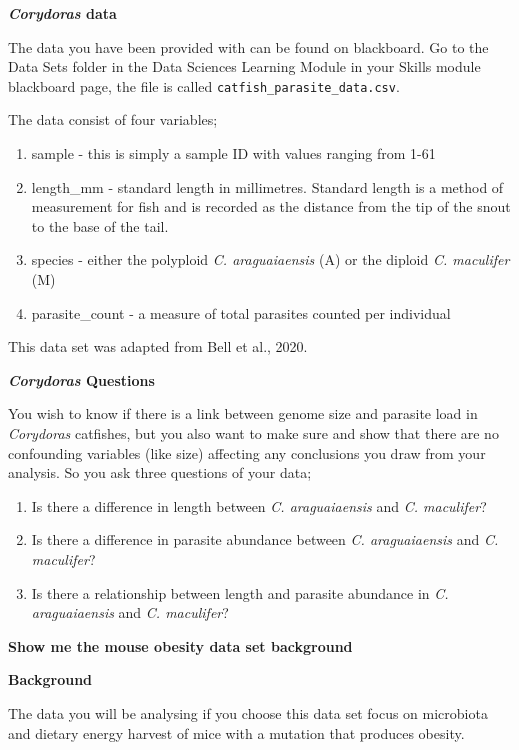 \documentclass[
]{book}
\providecommand{\tightlist}{%
  \setlength{\itemsep}{0pt}\setlength{\parskip}{0pt}}
\begin{document}
\textbf{\emph{Corydoras} data}

The data you have been provided with can be found on blackboard. Go to the Data Sets folder in the Data Sciences Learning Module in your Skills module blackboard page, the file is called \texttt{catfish\_parasite\_data.csv}.

The data consist of four variables;

\begin{enumerate}
\def\labelenumi{\arabic{enumi})}
\tightlist
\item
  sample - this is simply a sample ID with values ranging from 1-61
\item
  length\_mm - standard length in millimetres. Standard length is a method of measurement for fish and is recorded as the distance from the tip of the snout to the base of the tail.
\item
  species - either the polyploid \emph{C. araguaiaensis} (A) or the diploid \emph{C. maculifer} (M)
\item
  parasite\_count - a measure of total parasites counted per individual
\end{enumerate}

This data set was adapted from Bell et al., 2020.

\textbf{\emph{Corydoras} Questions}

You wish to know if there is a link between genome size and parasite load in \emph{Corydoras} catfishes, but you also want to make sure and show that there are no confounding variables (like size) affecting any conclusions you draw from your analysis. So you ask three questions of your data;

\begin{enumerate}
\def\labelenumi{\arabic{enumi})}
\tightlist
\item
  Is there a difference in length between \emph{C. araguaiaensis} and \emph{C. maculifer}?
\item
  Is there a difference in parasite abundance between \emph{C. araguaiaensis} and \emph{C. maculifer}?
\item
  Is there a relationship between length and parasite abundance in \emph{C. araguaiaensis} and \emph{C. maculifer}?
\end{enumerate}

\textbf{Show me the mouse obesity data set background}

\textbf{Background}

The data you will be analysing if you choose this data set focus on microbiota and dietary energy harvest of mice with a mutation that produces obesity.
\end{document}
